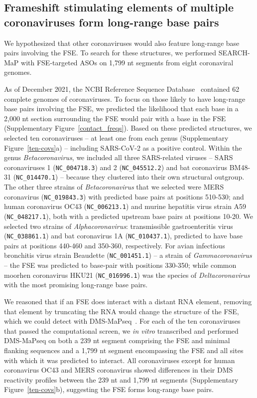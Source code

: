 \documentclass[main.tex]{subfiles}
\begin{document}
\subsection{Frameshift stimulating elements of multiple coronaviruses form long-range base pairs}

We hypothesized that other coronaviruses would also feature long-range base pairs involving the FSE.
To search for these structures, we performed SEARCH-MaP with FSE-targeted ASOs on 1,799 nt segments from eight coronaviral genomes.

As of December 2021, the NCBI Reference Sequence Database~\cite{OLeary2016} contained 62 complete genomes of coronaviruses.
To focus on those likely to have long-range base pairs involving the FSE, we predicted the likelihood that each base in a 2,000 nt section surrounding the FSE would pair with a base in the FSE (Supplementary Figure~\ref{contact_freqs}).
Based on these predicted structures, we selected ten coronaviruses -- at least one from each genus (Supplementary Figure~\ref{ten-covs}a) -- including SARS-CoV-2 as a positive control.
Within the genus \textit{Betacoronavirus}, we included all three SARS-related viruses -- SARS coronaviruses 1 (\verb|NC_004718.3|) and 2 (\verb|NC_045512.2|) and bat coronavirus BM48-31 (\verb|NC_014470.1|) -- because they clustered into their own structural outgroup.
The other three strains of \textit{Betacoronavirus} that we selected were MERS coronavirus (\verb|NC_019843.3|) with predicted base pairs at positions 510-530; and human coronavirus OC43 (\verb|NC_006213.1|) and murine hepatitis virus strain A59 (\verb|NC_048217.1|), both with a predicted upstream base pairs at positions 10-20.
We selected two strains of \textit{Alphacoronavirus}: transmissible gastroenteritis virus (\verb|NC_038861.1|) and bat coronavirus 1A (\verb|NC_010437.1|), predicted to have base pairs at positions 440-460 and 350-360, respectively.
For avian infectious bronchitis virus strain Beaudette (\verb|NC_001451.1|) -- a strain of \textit{Gammacoronavirus} -- the FSE was predicted to base-pair with positions 330-350; while common moorhen coronavirus HKU21 (\verb|NC_016996.1|) was the species of \textit{Deltacoronavirus} with the most promising long-range base pairs.

We reasoned that if an FSE does interact with a distant RNA element, removing that element by truncating the RNA would change the structure of the FSE, which we could detect with DMS-MaPseq~\cite{Zubradt2016}.
For each of the ten coronaviruses that passed the computational screen, we \textit{in vitro} transcribed and performed DMS-MaPseq on both a 239 nt segment comprising the FSE and minimal flanking sequences and a 1,799 nt segment encompassing the FSE and all sites with which it was predicted to interact.
All coronaviruses except for human coronavirus OC43 and MERS coronavirus showed differences in their DMS reactivity profiles between the 239 nt and 1,799 nt segments (Supplementary Figure~\ref{ten-covs}b), suggesting the FSE forms long-range base pairs.
\end{document}
